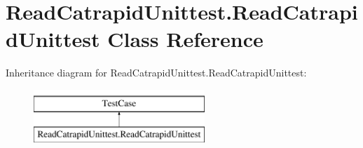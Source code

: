 \hypertarget{classReadCatrapidUnittest_1_1ReadCatrapidUnittest}{\section{Read\-Catrapid\-Unittest.\-Read\-Catrapid\-Unittest Class Reference}
\label{classReadCatrapidUnittest_1_1ReadCatrapidUnittest}
}
Inheritance diagram for Read\-Catrapid\-Unittest.\-Read\-Catrapid\-Unittest\-:\begin{figure}[H]
\begin{center}
\leavevmode
\includegraphics[height=2.000000cm]{classReadCatrapidUnittest_1_1ReadCatrapidUnittest}
\end{center}
\end{figure}
